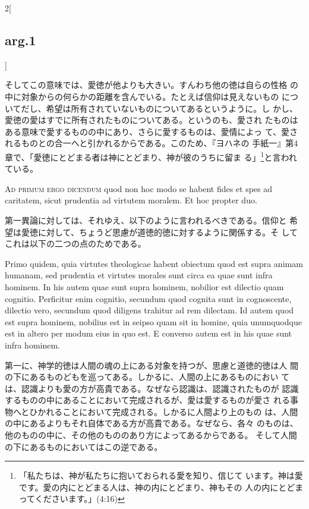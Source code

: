 \documentclass[paper=a4paper,fontsize=10pt,jafontsize=9pt,titlepage]{jlreq}
\begin{document}
\begin{paracol}{2}[\subsection{arg.1}]
\switchcolumn

そしてこの意味では、愛徳が他よりも大きい。すんわち他の徳は自らの性格
 の中に対象からの何らかの距離を含んでいる。たとえば信仰は見えないもの
 についてだし、希望は所有されていないものについてあるというように。し
 かし、愛徳の愛はすでに所有されたものについてある。というのも、愛され
 たものはある意味で愛するものの中にあり、さらに愛するものは、愛情によっ
 て、愛されるものとの合一へと引かれるからである。このため、『ヨハネの
 手紙一』第4章で、「愛徳にとどまる者は神にとどまり、神が彼のうちに留ま
 る」\footnote{「私たちは、神が私たちに抱いておられる愛を知り、信じて
 います。神は愛です。愛の内にとどまる人は、神の内にとどまり、神もその
 人の内にとどまってくださいます。」(4:16)}と言われている。

\switchcolumn*[\subsection{ad.1}]

{\scshape Ad primum ergo dicendum} quod non hoc modo se habent fides
 et spes ad caritatem, sicut prudentia ad virtutem moralem. Et hoc
 propter duo.

\switchcolumn

第一異論に対しては、それゆえ、以下のように言われるべきである。信仰と
 希望は愛徳に対して、ちょうど思慮が道徳的徳に対するように関係する。そ
 してこれは以下の二つの点のためである。

\switchcolumn*

Primo quidem, quia virtutes theologicae habent obiectum
 quod est supra animam humanam, sed prudentia et virtutes morales sunt
 circa ea quae sunt infra hominem. In his autem quae sunt supra
 hominem, nobilior est dilectio quam cognitio. Perficitur enim
 cognitio, secundum quod cognita sunt in cognoscente, dilectio vero,
 secundum quod diligens trahitur ad rem dilectam. Id autem quod est
 supra hominem, nobilius est in seipso quam sit in homine, quia
 unumquodque est in altero per modum eius in quo est. E converso autem
 est in his quae sunt infra hominem.

\switchcolumn

第一に、神学的徳は人間の魂の上にある対象を持つが、思慮と道徳的徳は人
 間の下にあるものどもを巡ってある。しかるに、人間の上にあるものにおい
 ては、認識よりも愛の方が高貴である。なぜなら認識は、認識されたものが
 認識するものの中にあることにおいて完成されるが、愛は愛するものが愛さ
 れる事物へとひかれることにおいて完成される。しかるに人間より上のもの
 は、人間の中にあるよりもそれ自体である方が高貴である。なぜなら、各々
 のものは、他のものの中に、その他のもののあり方によってあるからである。
 そして人間の下にあるものにおいてはこの逆である。


\end{paracol}
\end{document}
